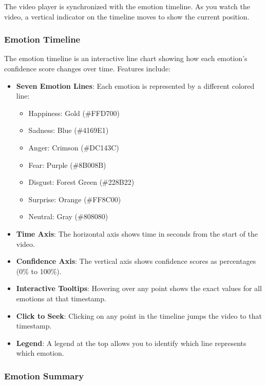 The video player is synchronized with the emotion timeline. As you watch the video, a vertical indicator on the timeline moves to show the current position.

\subsubsection{Emotion Timeline}

The emotion timeline is an interactive line chart showing how each emotion's confidence score changes over time. Features include:

\begin{itemize}
    \item \textbf{Seven Emotion Lines}: Each emotion is represented by a different colored line:
    \begin{itemize}
        \item Happiness: Gold (\#FFD700)
        \item Sadness: Blue (\#4169E1)
        \item Anger: Crimson (\#DC143C)
        \item Fear: Purple (\#8B008B)
        \item Disgust: Forest Green (\#228B22)
        \item Surprise: Orange (\#FF8C00)
        \item Neutral: Gray (\#808080)
    \end{itemize}

    \item \textbf{Time Axis}: The horizontal axis shows time in seconds from the start of the video.

    \item \textbf{Confidence Axis}: The vertical axis shows confidence scores as percentages (0\% to 100\%).

    \item \textbf{Interactive Tooltips}: Hovering over any point shows the exact values for all emotions at that timestamp.

    \item \textbf{Click to Seek}: Clicking on any point in the timeline jumps the video to that timestamp.

    \item \textbf{Legend}: A legend at the top allows you to identify which line represents which emotion.
\end{itemize}

\subsubsection{Emotion Summary}

